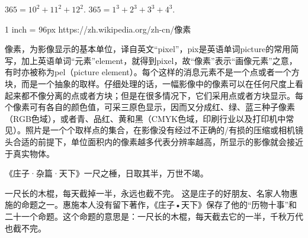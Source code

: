 \documentclass[ch1.tex]{subfiles}
\begin{document}
$365=10^2+11^2+12^2$.
$365=1^3+2^3+3^3+4^3$.


1 inch = 96px
https://zh.wikipedia.org/zh-cn/像素

像素，为影像显示的基本单位，译自英文“pixel”，pix是英语单词picture的常用简写，加上英语单词“元素”element，就得到pixel，故“像素”表示“画像元素”之意，有时亦被称为pel（picture element）。每个这样的消息元素不是一个点或者一个方块，而是一个抽象的取样。仔细处理的话，一幅影像中的像素可以在任何尺度上看起来都不像分离的点或者方块；但是在很多情况下，它们采用点或者方块显示。每个像素可有各自的颜色值，可采三原色显示，因而又分成红、绿、蓝三种子像素（RGB色域），或者青、品红、黄和黑（CMYK色域，印刷行业以及打印机中常见）。照片是一个个取样点的集合，在影像没有经过不正确的/有损的压缩或相机镜头合适的前提下，单位面积内的像素越多代表分辨率越高，所显示的影像就会接近于真实物体。


《庄子·杂篇·天下》一尺之棰，日取其半，万世不竭。

一尺长的木棍，每天截掉一半，永远也截不完。
这是庄子的好朋友、名家人物惠施的命题之一。惠施本人没有留下著作，《庄子•天下》保存了他的“历物十事”和二十一个命题。这个命题的意思是：一尺长的木棍，每天截去它的一半，千秋万代也截不完。
\end{document}

